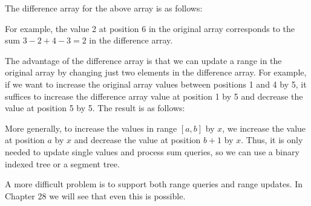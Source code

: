 The difference array for the above array is as follows:
\begin{center}
\end{center}

For example, the value 2 at position 6 in the original array
corresponds to the sum $3-2+4-3=2$ in the difference array.

The advantage of the difference array is
that we can update a range
in the original array by changing just
two elements in the difference array.
For example, if we want to 
increase the original array 
values between positions 1 and 4 by 5,
it suffices to increase the
difference array value at position 1 by 5
and decrease the value at position 5 by 5.
The result is as follows:

\begin{center}
\end{center}

More generally, to increase the values
in range $[a,b]$ by $x$,
we increase the value at position $a$ by $x$
and decrease the value at position $b+1$ by $x$.
Thus, it is only needed to update single values
and process sum queries,
so we can use a binary indexed tree or a segment tree.

A more difficult problem is to support both
range queries and range updates.
In Chapter 28 we will see that even this is possible.



